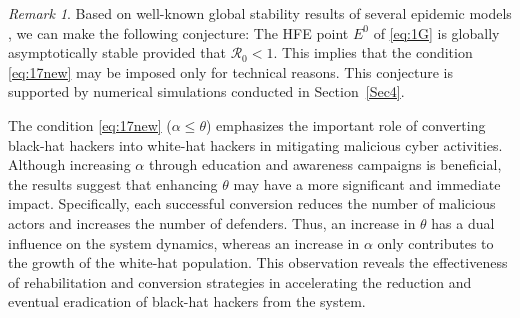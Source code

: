 \documentclass[11pt]{article}
\theoremstyle{definition}
\theoremstyle{remark}
\newtheorem{remark}[theorem]{Remark}
\numberwithin{equation}{section}
\begin{document}
\begin{remark}\label{NoteGAS}
Based on well-known global stability results of several epidemic models \cite{Allen, Brauer, Martcheva}, we can make the following conjecture: 
 The HFE point $E^0$ of \eqref{eq:1G} is globally asymptotically stable provided that $\mathcal{R}_0 < 1$. 
This implies that the condition \eqref{eq:17new} may be imposed only for technical reasons. 
This conjecture is supported by numerical simulations conducted in Section~\ref{Sec4}.
\end{remark}

The condition \eqref{eq:17new} ($\alpha \le \theta$) emphasizes the important role of converting black-hat hackers into white-hat hackers in mitigating malicious cyber activities. 
Although increasing $\alpha$ through education and awareness campaigns is beneficial, the results suggest that enhancing $\theta$ may have a more significant and immediate impact. 
Specifically, each successful conversion reduces the number of malicious actors and increases the number of defenders.
Thus, an increase in $\theta$ has a dual influence on the system dynamics, whereas an increase in $\alpha$ only contributes to the growth of the white-hat population. 
This observation reveals the effectiveness of rehabilitation and conversion strategies in accelerating the reduction and eventual eradication of black-hat hackers from the system.


\end{document}
